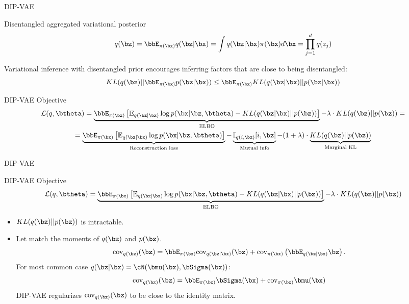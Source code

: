 \begin{frame}{DIP-VAE}
	\begin{block}{Disentangled aggregated variational posterior}
		\vspace{-0.3cm}
		\[
		q(\bz) = \bbE_{\pi(\bx)} q(\bz | \bx) = \int q(\bz | \bx) \pi(\bx) d\bx = \prod_{j=1}^d q(z_j)
		\]
		\vspace{-0.3cm}
	\end{block}
	Variational inference with disentangled prior encourages inferring factors that are close to being disentangled:
	\[
		KL(q(\bz) || \bbE_{\pi(\bx)} p(\bz | \bx)) \leq \bbE_{\pi(\bx)} KL(q(\bz | \bx) || p(\bz | \bx))	
	\]
	\begin{block}{DIP-VAE Objective}
		\vspace{-0.3cm}
		{\footnotesize
			\begin{multline*}
			\mathcal{L}(q, \btheta) = \underbrace{\bbE_{\pi(\bx)} \left[ \mathbb{E}_{q(\bz | \bx)} \log p(\bx | \bz, \btheta) - KL(q(\bz | \bx) || p(\bz)) \right]}_{\text{ELBO}} -\lambda \cdot KL(q(\bz) || p(\bz)) = \\
			= \underbrace{\bbE_{\pi(\bx)} \left[\mathbb{E}_{q(\bz | \bx)} \log p(\bx | \bz, \btheta)\right]}_{\text{Reconstruction loss}} - \underbrace{\mathbb{I}_{q(i, \bz)} [i, \bz]}_{\text{Mutual info}} - (1 + \lambda) \cdot \underbrace{KL(q(\bz) || p(\bz))}_{\text{Marginal KL}}
			\end{multline*}
		}
		\vspace{-0.3cm}
	\end{block}

\end{frame}
\begin{frame}{DIP-VAE}
	\begin{block}{DIP-VAE Objective}
		\vspace{-0.3cm}
		{\footnotesize
			\[
				\mathcal{L}(q, \btheta) = \underbrace{\bbE_{\pi(\bx)} \left[ \mathbb{E}_{q(\bz | \bx)} \log p(\bx | \bz, \btheta) - KL(q(\bz | \bx) || p(\bz)) \right]}_{\text{ELBO}} -\lambda \cdot KL(q(\bz) || p(\bz))
			\]
		}
		\vspace{-0.3cm}
	\end{block}
	\begin{itemize}
		\item $KL(q(\bz) || p(\bz))$ is intractable.
		\item Let match the moments of $q(\bz)$ and $p(\bz)$.
		\[
		\text{cov}_{q(\bz)}(\bz) = \bbE_{\pi(\bx)} \text{cov}_{q(\bz|\bx)}(\bz) + \text{cov}_{\pi(\bx)} \left( \bbE_{q(\bz | \bx)}\bz \right).
		\]
		For most common case $q(\bz | \bx) = \cN(\bmu(\bx), \bSigma(\bx))$:
		\[
		\text{cov}_{q(\bz)}(\bz) = \bbE_{\pi(\bx)} \bSigma(\bx) + \text{cov}_{\pi(\bx)} \bmu(\bx)
		\]
		DIP-VAE regularizes $\text{cov}_{q(\bz)}(\bz) $ to be close to the identity matrix.
	\end{itemize}

\end{frame}
